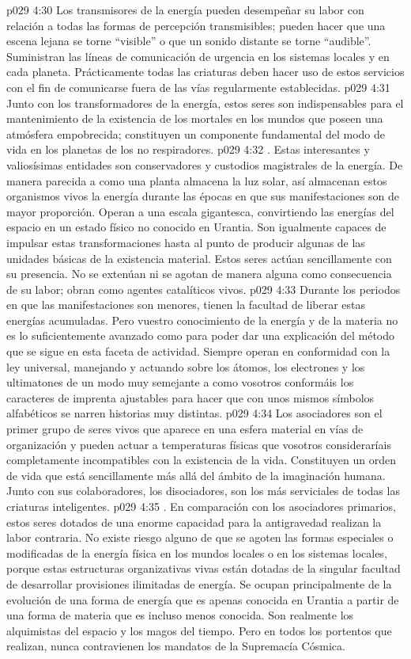 \vs p029 4:30 Los transmisores de la energía pueden desempeñar su labor con relación a todas las formas de percepción transmisibles; pueden hacer que una escena lejana se torne “visible” o que un sonido distante se torne “audible”. Suministran las líneas de comunicación de urgencia en los sistemas locales y en cada planeta. Prácticamente todas las criaturas deben hacer uso de estos servicios con el fin de comunicarse fuera de las vías regularmente establecidas.
\vs p029 4:31 Junto con los transformadores de la energía, estos seres son indispensables para el mantenimiento de la existencia de los mortales en los mundos que poseen una atmósfera empobrecida; constituyen un componente fundamental del modo de vida en los planetas de los no respiradores.
\vs p029 4:32 . Estas interesantes y valiosísimas entidades son conservadores y custodios magistrales de la energía. De manera parecida a como una planta almacena la luz solar, así almacenan estos organismos vivos la energía durante las épocas en que sus manifestaciones son de mayor proporción. Operan a una escala gigantesca, convirtiendo las energías del espacio en un estado físico no conocido en Urantia. Son igualmente capaces de impulsar estas transformaciones hasta al punto de producir algunas de las unidades básicas de la existencia material. Estos seres actúan sencillamente con su presencia. No se extenúan ni se agotan de manera alguna como consecuencia de su labor; obran como agentes catalíticos vivos.
\vs p029 4:33 Durante los periodos en que las manifestaciones son menores, tienen la facultad de liberar estas energías acumuladas. Pero vuestro conocimiento de la energía y de la materia no es lo suficientemente avanzado como para poder dar una explicación del método que se sigue en esta faceta de actividad. Siempre operan en conformidad con la ley universal, manejando y actuando sobre los átomos, los electrones y los ultimatones de un modo muy semejante a como vosotros conformáis los caracteres de imprenta ajustables para hacer que con unos mismos símbolos alfabéticos se narren historias muy distintas.
\vs p029 4:34 Los asociadores son el primer grupo de seres vivos que aparece en una esfera material en vías de organización y pueden actuar a temperaturas físicas que vosotros consideraríais completamente incompatibles con la existencia de la vida. Constituyen un orden de vida que está sencillamente más allá del ámbito de la imaginación humana. Junto con sus colaboradores, los disociadores, son los más serviciales de todas las criaturas inteligentes.
\vs p029 4:35 . En comparación con los asociadores primarios, estos seres dotados de una enorme capacidad para la antigravedad realizan la labor contraria. No existe riesgo alguno de que se agoten las formas especiales o modificadas de la energía física en los mundos locales o en los sistemas locales, porque estas estructuras organizativas vivas están dotadas de la singular facultad de desarrollar provisiones ilimitadas de energía. Se ocupan principalmente de la evolución de una forma de energía que es apenas conocida en Urantia a partir de una forma de materia que es incluso menos conocida. Son realmente los alquimistas del espacio y los magos del tiempo. Pero en todos los portentos que realizan, nunca contravienen los mandatos de la Supremacía Cósmica.
